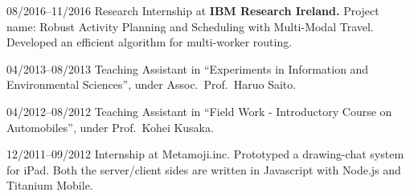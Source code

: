 \documentclass[letterpaper,11pt]{article}
\begin{document}
\begin{CV}
\item[08/2016--11/2016] Research Internship at \textbf{IBM Research Ireland.}
 Project name: Robust Activity Planning and Scheduling with Multi-Modal Travel.
 Developed an efficient algorithm for multi-worker routing.


\item[04/2013--08/2013] Teaching Assistant in ``Experiments in
 Information and Environmental Sciences'', under
 Assoc.\ Prof.\ Haruo Saito.

\item[04/2012--08/2012] Teaching Assistant in ``Field Work -
 Introductory Course on Automobiles'', under
 Prof.\ Kohei Kusaka.

\item[12/2011--09/2012] Internship at Metamoji.inc.  Prototyped a
  drawing-chat system for iPad. Both the server/client sides are
  written in Javascript with Node.js and Titanium Mobile.
\end{CV}
\end{document}
